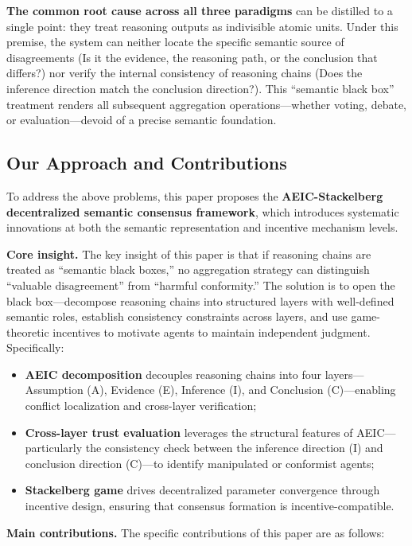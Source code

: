 \documentclass[12pt,a4paper]{article}
\begin{document}
\textbf{The common root cause across all three paradigms} can be distilled to a single point: they treat reasoning outputs as indivisible atomic units. Under this premise, the system can neither locate the specific semantic source of disagreements (Is it the evidence, the reasoning path, or the conclusion that differs?) nor verify the internal consistency of reasoning chains (Does the inference direction match the conclusion direction?). This ``semantic black box'' treatment renders all subsequent aggregation operations---whether voting, debate, or evaluation---devoid of a precise semantic foundation.

\subsection{Our Approach and Contributions}

To address the above problems, this paper proposes the \textbf{AEIC-Stackelberg decentralized semantic consensus framework}, which introduces systematic innovations at both the semantic representation and incentive mechanism levels.

\textbf{Core insight.} The key insight of this paper is that if reasoning chains are treated as ``semantic black boxes,'' no aggregation strategy can distinguish ``valuable disagreement'' from ``harmful conformity.'' The solution is to open the black box---decompose reasoning chains into structured layers with well-defined semantic roles, establish consistency constraints across layers, and use game-theoretic incentives to motivate agents to maintain independent judgment. Specifically:
\begin{itemize}[nosep]
    \item \textbf{AEIC decomposition} decouples reasoning chains into four layers---Assumption (A), Evidence (E), Inference (I), and Conclusion (C)---enabling conflict localization and cross-layer verification;
    \item \textbf{Cross-layer trust evaluation} leverages the structural features of AEIC---particularly the consistency check between the inference direction (I) and conclusion direction (C)---to identify manipulated or conformist agents;
    \item \textbf{Stackelberg game} drives decentralized parameter convergence through incentive design, ensuring that consensus formation is incentive-compatible.
\end{itemize}

\textbf{Main contributions.} The specific contributions of this paper are as follows:
\end{document}
